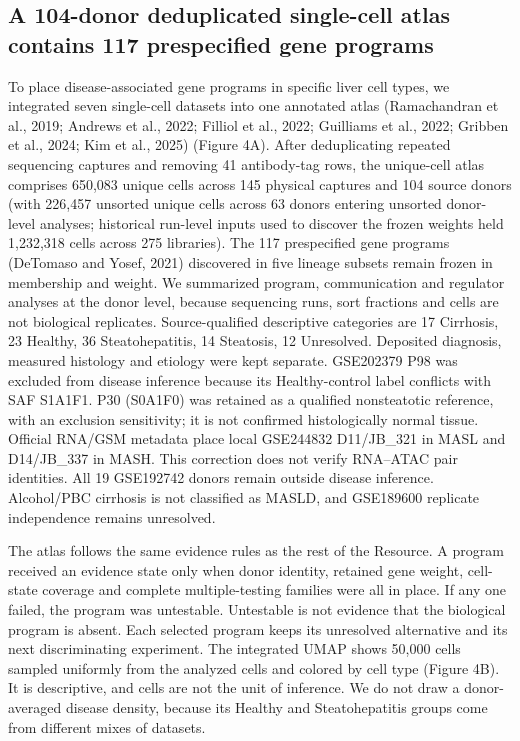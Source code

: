 \subsection{A 104-donor deduplicated single-cell atlas contains 117 prespecified gene programs}\label{a-102-donor-single-cell-atlas-contains-117-prespecified-gene-programs}

To place disease-associated gene programs in specific liver cell types, we integrated seven single-cell datasets into one annotated atlas (Ramachandran et al., 2019; Andrews et al., 2022; Filliol et al., 2022; Guilliams et al., 2022; Gribben et al., 2024; Kim et al., 2025) (Figure 4A). After deduplicating repeated sequencing captures and removing 41 antibody-tag rows, the unique-cell atlas comprises 650,083 unique cells across 145 physical captures and 104 source donors (with 226,457 unsorted unique cells across 63 donors entering unsorted donor-level analyses; historical run-level inputs used to discover the frozen weights held 1,232,318 cells across 275 libraries). The 117 prespecified gene programs (DeTomaso and Yosef, 2021) discovered in five lineage subsets remain frozen in membership and weight. We summarized program, communication and regulator analyses at the donor level, because sequencing runs, sort fractions and cells are not biological replicates. Source-qualified descriptive categories are 17 Cirrhosis, 23 Healthy, 36 Steatohepatitis, 14 Steatosis, 12 Unresolved. Deposited diagnosis, measured histology and etiology were kept separate. GSE202379 P98 was excluded from disease inference because its Healthy-control label conflicts with SAF S1A1F1. P30 (S0A1F0) was retained as a qualified nonsteatotic reference, with an exclusion sensitivity; it is not confirmed histologically normal tissue. Official RNA/GSM metadata place local GSE244832 D11/JB\_\allowbreak{}321 in MASL and D14/JB\_\allowbreak{}337 in MASH. This correction does not verify RNA--ATAC pair identities. All 19 GSE192742 donors remain outside disease inference. Alcohol/PBC cirrhosis is not classified as MASLD, and GSE189600 replicate independence remains unresolved.

The atlas follows the same evidence rules as the rest of the Resource. A program received an evidence state only when donor identity, retained gene weight, cell-state coverage and complete multiple-testing families were all in place. If any one failed, the program was untestable. Untestable is not evidence that the biological program is absent. Each selected program keeps its unresolved alternative and its next discriminating experiment. The integrated UMAP shows 50,000 cells sampled uniformly from the analyzed cells and colored by cell type (Figure 4B). It is descriptive, and cells are not the unit of inference. We do not draw a donor-averaged disease density, because its Healthy and Steatohepatitis groups come from different mixes of datasets.


